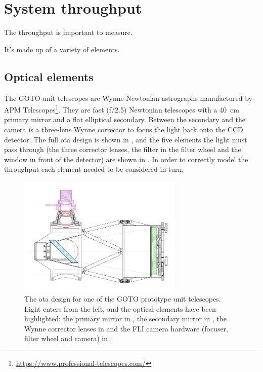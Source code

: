 \section{System throughput}
\label{sec:throughput}
\begin{colsection}


\begin{colsection}

The throughput is important to measure.

It's made up of a variety of elements.

\end{colsection}

\subsection{Optical elements}
\label{sec:optics}
\begin{colsection}

The GOTO unit telescopes are Wynne-Newtonian astrographs manufactured by APM Telescopes\footnote{\url{https://www.professional-telescopes.com/}}. They are fast (f/2.5) Newtonian telescopes with a \SI{40}{\centi\meter} primary mirror and a flat elliptical secondary. Between the secondary and the camera is a three-lens Wynne corrector to focus the light back onto the CCD detector. The full \gls{ota} design is shown in , and the five elements the light must pass through (the three corrector lenses, the filter in the filter wheel and the window in front of the detector) are shown in . In order to correctly model the throughput each element needed to be considered in turn.

\newpage

\begin{figure}[p]
    \begin{center}
        \includegraphics[width=0.7\textwidth]{images/throughput/OTA_optics.png}
    \end{center}
    \caption[GOTO optical telescope assembly]{
        The \gls{ota} design for one of the GOTO prototype unit telescopes. Light enters from the left, and the optical elements have been highlighted: the primary mirror in , the secondary mirror in , the Wynne corrector lenses in  and the FLI camera hardware (focuser, filter wheel and camera) in .
    }\label{fig:ota}
\end{figure}


\end{colsection}
\end{colsection}
